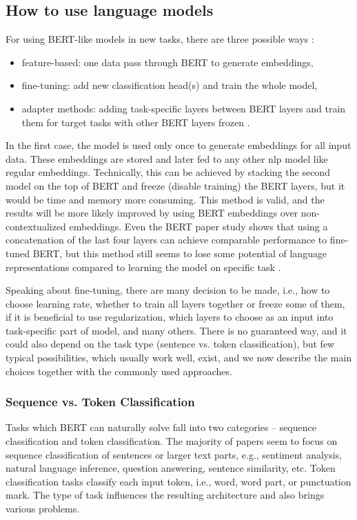 \subsection{How to use language models}
 \label{sub:howto}
 For using BERT-like models in new tasks, there are three possible ways \citep{Liu2020}: 
 \begin{itemize}
 \item feature-based: one data pass through BERT to generate embeddings,
 \item fine-tuning: add new classification head(s) and train the whole model,
 \item adapter methods: adding task-specific layers between BERT layers and train them for target tasks with other BERT layers frozen \citep{Stickland2019}.
 \end{itemize}
In the first case, the model is used only once to generate embeddings for all input data. These embeddings are stored and later fed to any other \acrshort{nlp} model like regular embeddings. Technically, this can be achieved by stacking the second model on the top of BERT and freeze (disable training) the BERT layers, but it would be time and memory more consuming. This method is valid, and the results will be more likely improved by using BERT embeddings over non-contextualized embeddings. Even the BERT paper study shows that using a concatenation of the last four layers can achieve comparable performance to fine-tuned BERT, but this method still seems to lose some potential of language representations compared to learning the model on specific task \citep{Sun}.
\par
Speaking about fine-tuning, there are many decision to be made, i.e., how to choose learning rate, whether to train all layers together or freeze some of them, if it is beneficial to use regularization, which layers to choose as an input into task-specific part of model, and many others. There is no guaranteed way, and it could also depend on the task type (sentence vs. token classification), but few typical possibilities, which usually work well, exist, and we now describe the main choices together with the commonly used approaches.

\subsubsection{Sequence vs. Token Classification}
Tasks which BERT can naturally solve fall into two categories -- sequence classification and token classification. The majority of papers seem to focus on sequence classification of sentences or larger text parts, e.g., sentiment analysis, natural language inference, question answering, sentence similarity, etc. Token classification tasks classify each input token, i.e., word, word part, or punctuation mark. The type of task influences the resulting architecture and also brings various problems.
